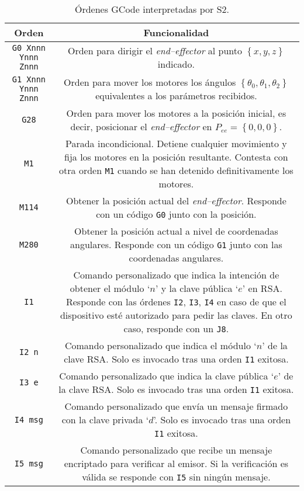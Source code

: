 \begin{longtable}{| C{0.5} | C{1} |}
    \caption{Órdenes GCode interpretadas por \ac{S2}.}
    \label{tab:gcode_def}
    \endfirsthead
    \endhead
    \hline
    \textbf{Orden} & \textbf{Funcionalidad} \\
    \hline
    \texttt{G0 Xnnn Ynnn Znnn} & Orden para dirigir el \textit{end--effector} al punto $\left\{x, y, z\right\}$ indicado. \\
    \hline
    \texttt{G1 Xnnn Ynnn Znnn} & Orden para mover los motores los ángulos $\left\{\theta_0, \theta_1, \theta_2\right\}$ equivalentes a los parámetros recibidos. \\
    \hline
    \texttt{G28} & Orden para mover los motores a la posición inicial, es decir, posicionar el \textit{end--effector} en $P_{ee} = \left\{0, 0, 0\right\}$. \\
    \hline
    \texttt{M1} & Parada incondicional. Detiene cualquier movimiento y fija los motores en la posición resultante. Contesta con otra orden \texttt{M1} cuando se han detenido definitivamente los motores. \\
    \hline
    \texttt{M114} & Obtener la posición actual del \textit{end--effector}. Responde con un código \texttt{G0} junto con la posición. \\
    \hline
    \texttt{M280} & Obtener la posición actual a nivel de coordenadas angulares. Responde con un código \texttt{G1} junto con las coordenadas angulares. \\
    \hline
    \texttt{I1} & Comando personalizado que indica la intención de obtener el módulo `$n$' y la clave pública `$e$' en RSA. Responde con las órdenes \texttt{I2}, \texttt{I3}, \texttt{I4} en caso de que el dispositivo esté autorizado para pedir las claves. En otro caso, responde con un \texttt{J8}. \\
    \hline
    \texttt{I2 n} & Comando personalizado que indica el módulo `$n$' de la clave RSA. Solo es invocado tras una orden \texttt{I1} exitosa. \\
    \hline
    \texttt{I3 e} & Comando personalizado que indica la clave pública `$e$' de la clave RSA. Solo es invocado tras una orden \texttt{I1} exitosa. \\
    \hline
    \texttt{I4 msg} & Comando personalizado que envía un mensaje firmado con la clave privada `$d$'. Solo es invocado tras una orden \texttt{I1} exitosa. \\
    \hline
    \texttt{I5 msg} & Comando personalizado que recibe un mensaje encriptado para verificar al emisor. Si la verificación es válida se responde con \texttt{I5} sin ningún mensaje. \\

\end{longtable}
